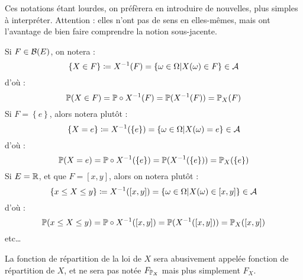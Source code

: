 \documentclass[../integ-proba.tex]{subfiles}
\begin{document}
    \begin{rem}
        Ces notations étant lourdes, on préfèrera en introduire de nouvelles, plus simples à interpréter.
        Attention : elles n'ont pas de sens en elles-mêmes, mais ont l'avantage de bien faire comprendre la notion sous-jacente.
        \begin{itemize}
            \itemb Si $F \in \mathcal{B}(E)$, on notera :
            \begin{displaymath}
                    \left\{ X \in F \right\} \coloneqq X^{-1}(F) = \left\{ \omega \in \Omega | X(\omega) \in F \right\} \in \mathcal{A}
            \end{displaymath}
            d'où :
            \begin{displaymath}
                \mathbb{P}(X \in F) = \mathbb{P} \circ X^{-1}(F) = \mathbb{P}(X^{-1}(F)) = \mathbb{P}_X(F)
            \end{displaymath}
            \itemb Si $F = \left\{ e \right\}$, alors notera plutôt :
            \begin{displaymath}
                \left\{ X = e \right\} \coloneqq X^{-1}(\left\{ e \right\}) = \left\{ \omega \in \Omega | X(\omega) = e \right\} \in \mathcal{A}
            \end{displaymath}
            d'où :
            \begin{displaymath}
                \mathbb{P}(X = e) = \mathbb{P} \circ X^{-1}(\left\{ e \right\}) = \mathbb{P}(X^{-1}(\left\{ e \right\})) = \mathbb{P}_X(\left\{ e \right\})
            \end{displaymath}
            \itemb Si $E=\mathbb{R}$, et que $F = [x,y]$, alors on notera plutôt :
            \begin{displaymath}
                \left\{ x \leq X \leq y \right\} \coloneqq X^{-1}([x,y]) = \left\{ \omega \in \Omega | X(\omega) \in [x,y] \right\} \in \mathcal{A}
            \end{displaymath}
            d'où :
            \begin{displaymath}
                \mathbb{P}(x \leq X \leq y) = \mathbb{P} \circ X^{-1}([x,y]) = \mathbb{P}(X^{-1}([x,y])) = \mathbb{P}_X([x,y])
            \end{displaymath}
            \itemb etc\ldots
        \end{itemize}
    \end{rem}

    \begin{rem}
        La fonction de répartition de la loi de $X$ sera abusivement appelée fonction de répartition de $X$, et ne sera pas notée $F_{\mathbb{P}_X}$ mais plus simplement $F_X$.
    \end{rem}
\end{document}
